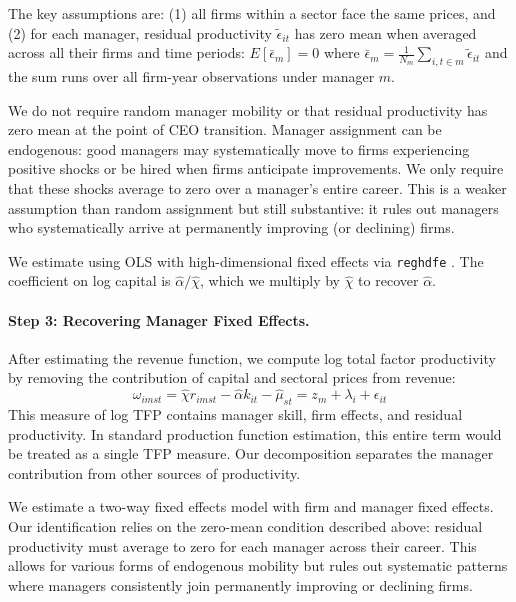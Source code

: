 \documentclass[11pt,a4paper]{article}
\begin{document}
The key assumptions are: (1) all firms within a sector face the same prices, and (2) for each manager, residual productivity $\tilde{\epsilon}_{it}$ has zero mean when averaged across all their firms and time periods: $E[\bar{\epsilon}_m] = 0$ where $\bar{\epsilon}_m = \frac{1}{N_m}\sum_{i,t \in m} \tilde{\epsilon}_{it}$ and the sum runs over all firm-year observations under manager $m$.

We do not require random manager mobility or that residual productivity has zero mean at the point of CEO transition. Manager assignment can be endogenous: good managers may systematically move to firms experiencing positive shocks or be hired when firms anticipate improvements. We only require that these shocks average to zero over a manager's entire career. This is a weaker assumption than random assignment but still substantive: it rules out managers who systematically arrive at permanently improving (or declining) firms.

We estimate using OLS with high-dimensional fixed effects via \texttt{reghdfe} \citep{reghdfe}. The coefficient on log capital is $\hat{\alpha}/\hat{\chi}$, which we multiply by $\hat{\chi}$ to recover $\hat{\alpha}$.

\paragraph{Step 3: Recovering Manager Fixed Effects.} After estimating the revenue function, we compute log total factor productivity by removing the contribution of capital and sectoral prices from revenue:
\begin{equation}
\omega_{imst} = \hat{\chi} r_{imst} - \hat{\alpha} k_{it} - \hat{\mu}_{st} = z_m + \lambda_i + \epsilon_{it}
\end{equation}
This measure of log TFP contains manager skill, firm effects, and residual productivity. In standard production function estimation, this entire term would be treated as a single TFP measure. Our decomposition separates the manager contribution from other sources of productivity.

We estimate a two-way fixed effects model with firm and manager fixed effects. Our identification relies on the zero-mean condition described above: residual productivity must average to zero for each manager across their career. This allows for various forms of endogenous mobility but rules out systematic patterns where managers consistently join permanently improving or declining firms. 
\end{document}
